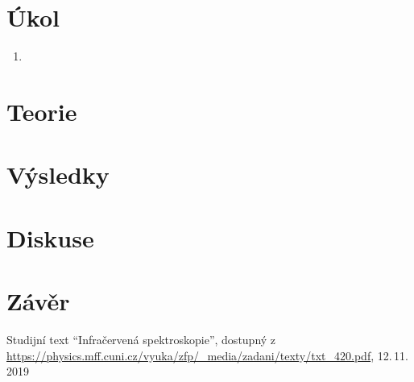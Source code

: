 \documentclass{protokol}
\begin{document}
    \section*{Úkol}

    \begin{enumerate}

        \item
    \end{enumerate}

    \section*{Teorie}

    \section*{Výsledky}



    \section*{Diskuse}



    \section*{Závěr}



    \begin{thebibliography}{}

        Studijní text ``Infračervená spektroskopie'', dostupný z\\ \url{https://physics.mff.cuni.cz/vyuka/zfp/_media/zadani/texty/txt_420.pdf}, 12.\,11.\,2019

    \end{thebibliography}
\end{document}

